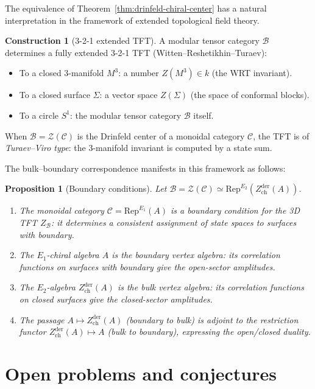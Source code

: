 \documentclass[11pt]{article}
\newtheorem{proposition}[theorem]{Proposition}
\theoremstyle{definition}
\newtheorem{construction}[theorem]{Construction}
\theoremstyle{remark}
\newcommand{\Rep}{\mathrm{Rep}}
\newcommand{\cB}{\mathcal{B}}
\newcommand{\cC}{\mathcal{C}}
\newcommand{\cZ}{\mathcal{Z}}
\newcommand{\Zder}{Z^{\mathrm{der}}_{\mathrm{ch}}}
\begin{document}
The equivalence of Theorem~\ref{thm:drinfeld-chiral-center} has a natural interpretation in the framework of extended topological field theory.

\begin{construction}[3-2-1 extended TFT]
\label{constr:extended-tft}
A modular tensor category $\cB$ determines a fully extended 3-2-1 TFT (Witten--Reshetikhin--Turaev):
\begin{itemize}
 \item To a closed 3-manifold $M^3$: a number $Z(M^3) \in k$ (the WRT invariant).
 \item To a closed surface $\Sigma$: a vector space $Z(\Sigma)$ (the space of conformal blocks).
 \item To a circle $S^1$: the modular tensor category $\cB$ itself.
\end{itemize}
When $\cB = \cZ(\cC)$ is the Drinfeld center of a monoidal category $\cC$, the TFT is of \emph{Turaev--Viro type}: the 3-manifold invariant is computed by a state sum.
\end{construction}

The bulk--boundary correspondence manifests in this framework as follows:

\begin{proposition}[Boundary conditions]
\label{prop:boundary-conditions}
Let $\cB = \cZ(\cC) \simeq \Rep^{E_2}(\Zder(A))$.
\begin{enumerate}[label=(\roman*)]
 \item The monoidal category $\cC = \Rep^{E_1}(A)$ is a \emph{boundary condition} for the 3D TFT $Z_\cB$: it determines a consistent assignment of state spaces to surfaces with boundary.
 \item The $E_1$-chiral algebra $A$ is the \emph{boundary vertex algebra}: its correlation functions on surfaces with boundary give the open-sector amplitudes.
 \item The $E_2$-algebra $\Zder(A)$ is the \emph{bulk vertex algebra}: its correlation functions on closed surfaces give the closed-sector amplitudes.
 \item The passage $A \mapsto \Zder(A)$ (boundary to bulk) is adjoint to the restriction functor $\Zder(A) \mapsto A$ (bulk to boundary), expressing the open/closed duality.
\end{enumerate}
\end{proposition}


\section{Open problems and conjectures}
\label{sec:open-problems}
\end{document}
